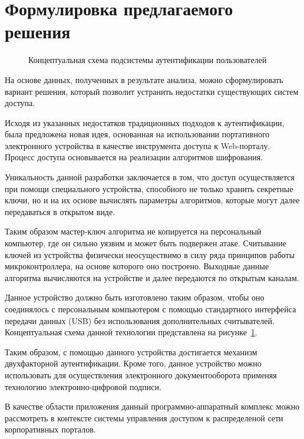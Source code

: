 \section{Формулировка предлагаемого решения}

\begin{figure}[ht]
\center{\texttt{[image: 1-5-1]}}
\caption{Концептуальная схема подсистемы аутентификации пользователей}
\label{ris:1.5.1}
\end{figure} 

На основе данных, полученных в результате анализа, можно сформулировать вариант
решения, который позволит устранить недостатки существующих систем доступа.

Исходя из указанных недостатков традиционных подходов к аутентификации, была
предложена новая идея, основанная на использовании портативного
электронного устройства в качестве инструмента доступа к Web-порталу. Процесс
доступа основывается на реализации алгоритмов шифрования.
~\cite{thesis_digit_sign,thesis_smart_card}

Уникальность данной разработки заключается в том, что доступ осуществляется при
помощи специального устройства, способного не только хранить секретные ключи, но
и на их основе вычислять параметры алгоритмов, которые могут далее передаваться
в открытом виде.

Таким образом мастер-ключ алгоритма не копируется на персональный компьютер, где
он сильно уязвим и может быть подвержен атаке. Считывание ключей из устройства
физически неосуществимо в силу ряда принципов работы микроконтроллера, на основе
которого оно построено. Выходные данные алгоритма вычисляются на устройстве и
далее передаются по открытым каналам.

Данное устройство должно быть изготовлено таким образом, чтобы оно соединялось с
персональным компьютером с помощью стандартного интерфейса передачи данных (USB)
без использования дополнительных считывателей. Концептуальная схема данной
технологии представлена на рисунке~\ref{ris:1.5.1}.

Таким образом, с помощью данного устройства достигается механизм двухфакторной
аутентификации. Кроме того, данное устройство можно использовать для
осуществления электронного документооборота применяя технологию
электронно-цифровой подписи.

В качестве области приложения данный программно-аппаратный комплекс можно
рассмотреть в контексте системы управления доступом к распределеной сети
корпоративных порталов.~\cite{conf_itnop_lsa_concept}

